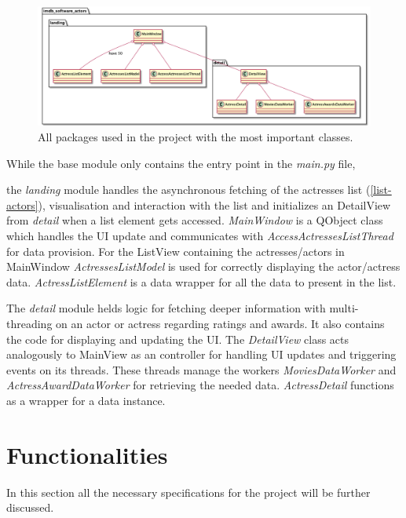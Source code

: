 \documentclass[12pt]{article}
\begin{document}
\begin{figure}[H]
      \begin{center}
            \includegraphics[scale=0.32]{img/class_diagram.png}
            \caption{\label{fig:packages} All packages used in the project with
                  the most important classes.}
      \end{center}
\end{figure}

While the base module only contains the entry point in the \textit{main.py} file,

the \textit{landing} module handles the asynchronous fetching of the actresses 
list (\ref{list-actors}), visualisation and interaction with the list and initializes an DetailView 
from \textit{detail} when a list element gets accessed.
\textit{MainWindow} is a QObject class which handles the UI update and communicates with 
\textit{AccessActressesListThread} for data provision. For the ListView containing the actresses/actors 
in MainWindow \textit{ActressesListModel} is used for correctly displaying the actor/actress data.
\textit{ActressListElement} is a data wrapper for all the data to present in the list.

The \textit{detail} module helds logic for fetching deeper information with multi-threading on 
an actor or actress regarding ratings and awards. It also contains the code for displaying and 
updating the UI.
The \textit{DetailView} class acts analogously to MainView as an controller for handling UI updates and
triggering events on its threads. These threads manage the workers \textit{MoviesDataWorker} and 
\textit{ActressAwardDataWorker} for retrieving the needed data. \textit{ActressDetail} functions as a 
wrapper for a data instance.

\newpage

\section{Functionalities}
In this section all the necessary specifications for the project will be further discussed.
\end{document}
